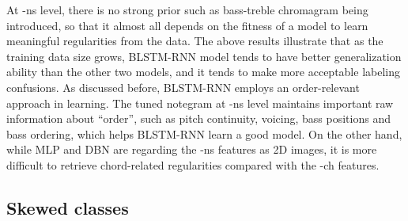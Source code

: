 At -ns level, there is no strong prior such as bass-treble chromagram being introduced, so that it almost all depends on the fitness of a model to learn meaningful regularities from the data. The above results illustrate that as the training data size grows, BLSTM-RNN model tends to have better generalization ability than the other two models, and it tends to make more acceptable labeling confusions. As discussed before, BLSTM-RNN employs an order-relevant approach in learning. The tuned notegram at -ns level maintains important raw information about ``order'', such as pitch continuity, voicing, bass positions and bass ordering, which helps BLSTM-RNN learn a good model. On the other hand, while MLP and DBN are regarding the -ns features as 2D images, it is more difficult to retrieve chord-related regularities compared with the -ch features.

\subsection{Skewed classes}\label{sec:3-p7}

